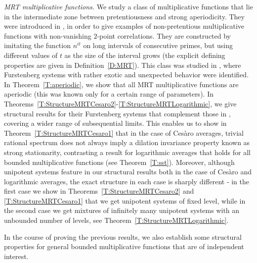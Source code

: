 \documentclass[11pt]{amsart}
\theoremstyle{definition}
\begin{document}
 {\em MRT multiplicative functions.}
 We study  a class of multiplicative functions that lie in the intermediate zone between pretentiousness and strong aperiodicity.  They were introduced in \cite[Appendix~B]{MRT15}, in order to give examples of non-pretentious multiplicative functions with non-vanishing $2$-point correlations. They are constructed by imitating the function $n^{it}$ on long intervals of consecutive primes, but using different values of $t$ %
 as the size of the interval grows (the explicit defining properties are given in Definition~\ref{D:MRT}).
 This class was studied in \cite{GLR21},
 where  Furstenberg systems with rather exotic and unexpected behavior were identified.
 In Theorem~\ref{T:aperiodic}, we show that all  MRT multiplicative functions are aperiodic  (this was known only for a certain range of parameters). In Theorems~\ref{T:StructureMRTCesaro2}-\ref{T:StructureMRTLogarithmic},   we give structural results for their Furstenberg systems that complement those in  \cite{GLR21}, covering a wider range of subsequential limits.  This enables us to show  in Theorem~\ref{T:StructureMRTCesaro1} that in the case of Ces\`aro averages,
 trivial rational spectrum   does not always imply a dilation invariance property known as  strong stationarity, contrasting a result  for logarithmic averages that holds for all bounded multiplicative functions (see Theorem~\ref{T:sst}).
 Moreover, although unipotent systems feature in our structural results  both in the  case of Ces\`aro and logarithmic averages, the exact structure  in each case is  sharply different - in the first case we  show in Theorems~\ref{T:StructureMRTCesaro2}  and \ref{T:StructureMRTCesaro1} that we get unipotent systems of fixed level, while  in the second  case  we  get mixtures of infinitely many unipotent systems with an  unbounded  number of levels, see Theorem~\ref{T:StructureMRTLogarithmic}.

\smallskip

In the course of proving the previous results, we also establish some structural properties for general bounded multiplicative functions that are of independent interest.

\smallskip
\end{document}
